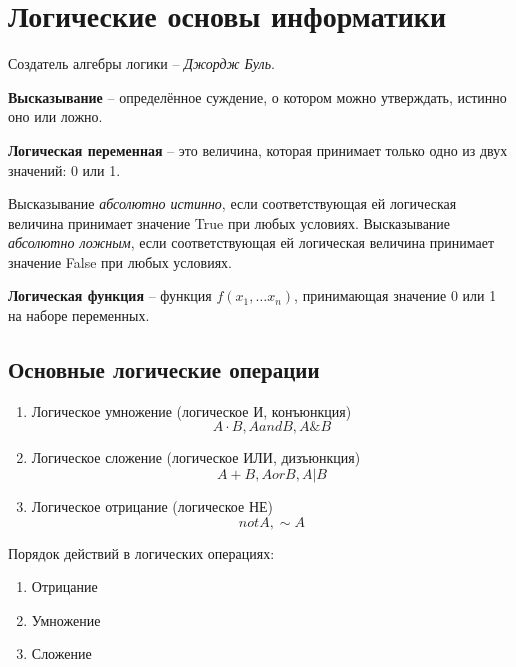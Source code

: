 \section{Логические основы информатики}

Создатель алгебры логики -- \textit{Джордж Буль}.

\begin{definition}
  \textbf{Высказывание} -- определённое суждение, о котором можно утверждать, истинно оно или ложно.
\end{definition}

\begin{definition}
  \textbf{Логическая переменная} -- это величина, которая принимает только одно из двух значений: 0 или 1.
\end{definition}

Высказывание \textit{абсолютно истинно}, если соответствующая ей логическая величина принимает значение True при любых условиях.
Высказывание \textit{абсолютно ложным}, если соответствующая ей логическая величина принимает значение False при любых условиях.

\begin{definition}
  \textbf{Логическая функция} -- функция $f(x_1, \ldots x_{n})$, принимающая значение 0 или 1 на наборе переменных.
\end{definition}

\subsection{Основные логические операции}

\begin{enumerate}
  \item Логическое умножение (логическое И, конъюнкция) \[
    A \cdot B, A and B, A \& B
  \] 

  \item Логическое сложение (логическое ИЛИ, дизъюнкция) \[
    A+B, A or B, A | B
\]

  \item Логическое отрицание (логическое НЕ) \[
    not A, \sim A
\] 
\end{enumerate}

Порядок действий в логических операциях:
\begin{enumerate}
  \item Отрицание
  \item Умножение
  \item Сложение
\end{enumerate}

